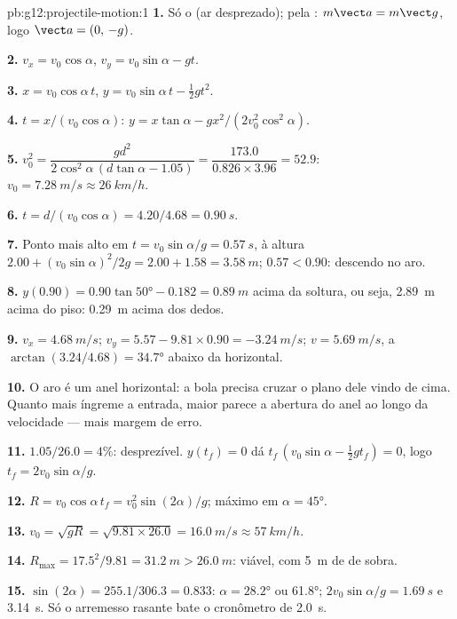 \begin{solution}{pb:g12:projectile-motion:1}
\textbf{1.} Só o  (ar desprezado); pela :
$m\vect a = m\vect g$, logo $\vect a = (0,\,-g)$.

\textbf{2.} $v_x = v_0\cos\alpha$, $v_y = v_0\sin\alpha - gt$.

\textbf{3.} $x = v_0\cos\alpha\, t$,
$y = v_0\sin\alpha\, t - \tfrac12 gt^2$.

\textbf{4.} $t = x/(v_0\cos\alpha)$:
$y = x\tan\alpha - g x^2/(2v_0^2\cos^2\alpha)$.

\textbf{5.} $v_0^2 = \dfrac{g d^2}{2\cos^2\alpha\,(d\tan\alpha -
1.05)} = \dfrac{173.0}{0.826 \times 3.96} = 52.9$:
$v_0 = \qty{7.28}{m/s} \approx \qty{26}{km/h}$.

\textbf{6.} $t = d/(v_0\cos\alpha) = 4.20/4.68 = \qty{0.90}{s}$.

\textbf{7.} Ponto mais alto em $t = v_0\sin\alpha/g = \qty{0.57}{s}$, à
altura $2.00 + (v_0\sin\alpha)^2/2g = 2.00 + 1.58 = \qty{3.58}{m}$;
$0.57 < 0.90$: descendo no aro.

\textbf{8.} $y(0.90) = 0.90\tan\ang{50} - 0.182 = \qty{0.89}{m}$ acima da
soltura, ou seja, \qty{2.89}{m} acima do piso: \qty{0.29}{m} acima dos
dedos.

\textbf{9.} $v_x = \qty{4.68}{m/s}$;
$v_y = 5.57 - 9.81 \times 0.90 = \qty{-3.24}{m/s}$;
$v = \qty{5.69}{m/s}$, a $\arctan(3.24/4.68) = \ang{34.7}$ abaixo da
horizontal.

\textbf{10.} O aro é um anel horizontal: a bola precisa cruzar o plano
dele vindo de cima. Quanto mais íngreme a entrada, maior parece a abertura
do anel ao longo da velocidade --- mais margem de erro.

\textbf{11.} $1.05/26.0 = 4\%$: desprezível. $y(t_f) = 0$ dá
$t_f\,(v_0\sin\alpha - \tfrac12 g t_f) = 0$, logo
$t_f = 2v_0\sin\alpha/g$.

\textbf{12.} $R = v_0\cos\alpha\, t_f = v_0^2\sin(2\alpha)/g$; máximo em
$\alpha = \ang{45}$.

\textbf{13.} $v_0 = \sqrt{gR} = \sqrt{9.81 \times 26.0} =
\qty{16.0}{m/s} \approx \qty{57}{km/h}$.

\textbf{14.} $R_{\max} = 17.5^2/9.81 = \qty{31.2}{m} > \qty{26.0}{m}$:
viável, com \qty{5}{m} de  de sobra.

\textbf{15.} $\sin(2\alpha) = 255.1/306.3 = 0.833$:
$\alpha = \ang{28.2}$ ou \ang{61.8}; 
$2v_0\sin\alpha/g = \qty{1.69}{s}$ e \qty{3.14}{s}. Só o arremesso
rasante bate o cronômetro de \qty{2.0}{s}.


\end{solution}
